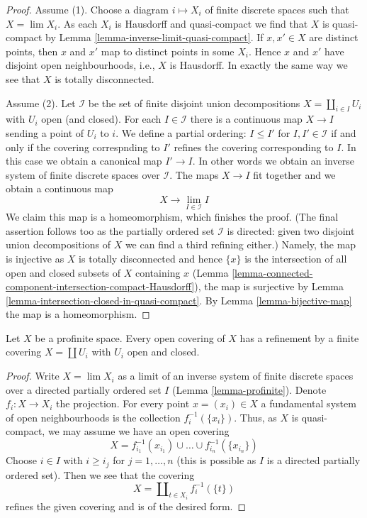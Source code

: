 \begin{proof}
Assume (1). Choose a diagram $i \mapsto X_i$ of finite discrete spaces
such that $X = \lim X_i$. As each $X_i$ is Hausdorff and quasi-compact we find
that $X$ is quasi-compact by Lemma \ref{lemma-inverse-limit-quasi-compact}.
If $x, x' \in X$ are distinct points, then $x$ and $x'$ map to
distinct points in some $X_i$. Hence $x$ and $x'$ have disjoint
open neighbourhoods, i.e., $X$ is Hausdorff. In exactly the same way
we see that $X$ is totally disconnected.

\medskip\noindent
Assume (2). Let $\mathcal{I}$ be the set of finite disjoint union
decompositions $X = \coprod_{i \in I} U_i$ with $U_i$ open (and closed).
For each $I \in \mathcal{I}$ there is a continuous map
$X \to I$ sending a point of $U_i$ to $i$. We define a partial
ordering: $I \leq I'$ for $I, I' \in \mathcal{I}$ if and only
if the covering correspnding to $I'$ refines the covering corresponding
to $I$. In this case we obtain a canonical map $I' \to I$. In other
words we obtain an inverse system of finite discrete spaces over $\mathcal{I}$.
The maps $X \to I$ fit together and we obtain a continuous map
$$
X \longrightarrow \lim_{I \in \mathcal{I}} I
$$
We claim this map is a homeomorphism, which finishes the proof.
(The final assertion follows too as the partially ordered set
$\mathcal{I}$ is directed: given two disjoint union decompositions
of $X$ we can find a third refining either.)
Namely, the map is injective as $X$ is totally disconnected
and hence $\{x\}$ is the intersection of all open and closed subsets
of $X$ containing $x$
(Lemma \ref{lemma-connected-component-intersection-compact-Hausdorff}),
the map is surjective by
Lemma \ref{lemma-intersection-closed-in-quasi-compact}.
By Lemma \ref{lemma-bijective-map} the map is a homeomorphism.
\end{proof}

\begin{lemma}
\label{lemma-profinite-refine-open-covering}
Let $X$ be a profinite space. Every open covering of $X$ has a refinement
by a finite covering $X = \coprod U_i$ with $U_i$ open and closed.
\end{lemma}

\begin{proof}
Write $X = \lim X_i$ as a limit of an inverse system of finite discrete
spaces over a directed partially ordered set $I$ (Lemma \ref{lemma-profinite}).
Denote $f_i : X \to X_i$ the projection.
For every point $x = (x_i) \in X$ a fundamental system of open neighbourhoods
is the collection $f_i^{-1}(\{x_i\})$. Thus, as $X$ is quasi-compact, we may
assume we have an open covering
$$
X = f_{i_1}^{-1}(x_{i_1}) \cup \ldots \cup f_{i_n}^{-1}(\{x_{i_n}\})
$$
Choose $i \in I$ with $i \geq i_j$ for $j = 1, \ldots, n$ (this is possible
as $I$ is a directed partially ordered set). Then we see
that the covering
$$
X = \coprod\nolimits_{t \in X_i} f_i^{-1}(\{t\})
$$
refines the given covering and is of the desired form.
\end{proof}

